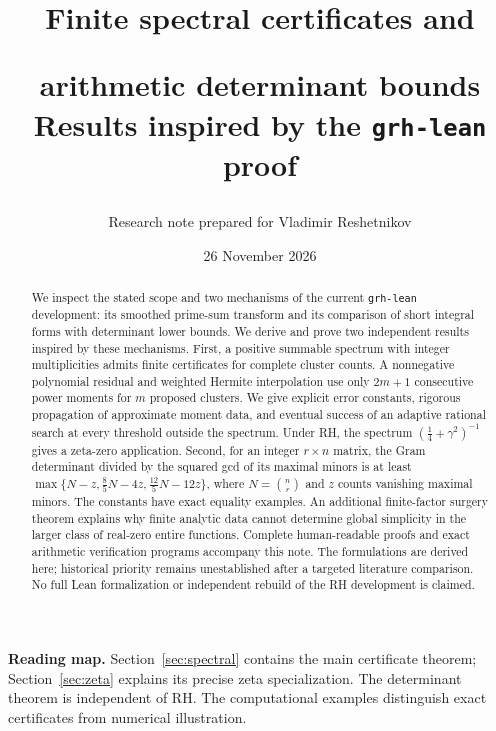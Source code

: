\documentclass[11pt]{article}
\title{\color{navy}\LARGE Finite spectral certificates and\par arithmetic determinant bounds\vspace{0.4em}\\
\large Results inspired by the \texttt{grh-lean} proof}
\author{Research note prepared for Vladimir Reshetnikov}
\date{26 November 2026}
\theoremstyle{definition}
\theoremstyle{remark}
\numberwithin{equation}{section}
\begin{document}
\maketitle
\begin{abstract}
We inspect the stated scope and two mechanisms of the current \texttt{grh-lean}
development: its smoothed prime-sum transform and its comparison of short
integral forms with determinant lower bounds. We derive and prove two
independent results inspired by these mechanisms.
First, a positive summable spectrum with integer multiplicities admits
finite certificates for complete cluster counts. A nonnegative polynomial
residual and weighted Hermite interpolation use only $2m+1$ consecutive
power moments for $m$ proposed clusters. We give explicit error constants,
rigorous propagation of approximate moment data, and eventual success of an
adaptive rational search at every threshold outside the spectrum. Under RH,
the spectrum $(\tfrac14+\gamma^2)^{-1}$ gives a zeta-zero application.
Second, for an integer $r\times n$ matrix, the Gram determinant divided by
the squared gcd of its maximal minors is at least
$\max\{N-z,\frac85N-4z,\frac{12}5N-12z\}$, where $N=\binom nr$ and $z$
counts vanishing maximal minors. The constants have exact equality examples.
An additional finite-factor surgery theorem explains why finite analytic
data cannot determine global simplicity in the larger class of real-zero
entire functions. Complete human-readable proofs and exact arithmetic
verification programs accompany this note. The formulations are derived
here; historical priority remains unestablished after a targeted literature
comparison. No full Lean formalization or independent rebuild of the RH
development is claimed.
\end{abstract}
\vspace{0.5em}
\noindent\textbf{Reading map.} Section~\ref{sec:spectral} contains the main
certificate theorem; Section~\ref{sec:zeta} explains its precise zeta
specialization. The determinant theorem is independent of RH.
The computational examples distinguish exact certificates from numerical
illustration.
\tableofcontents
\clearpage






\end{document}
